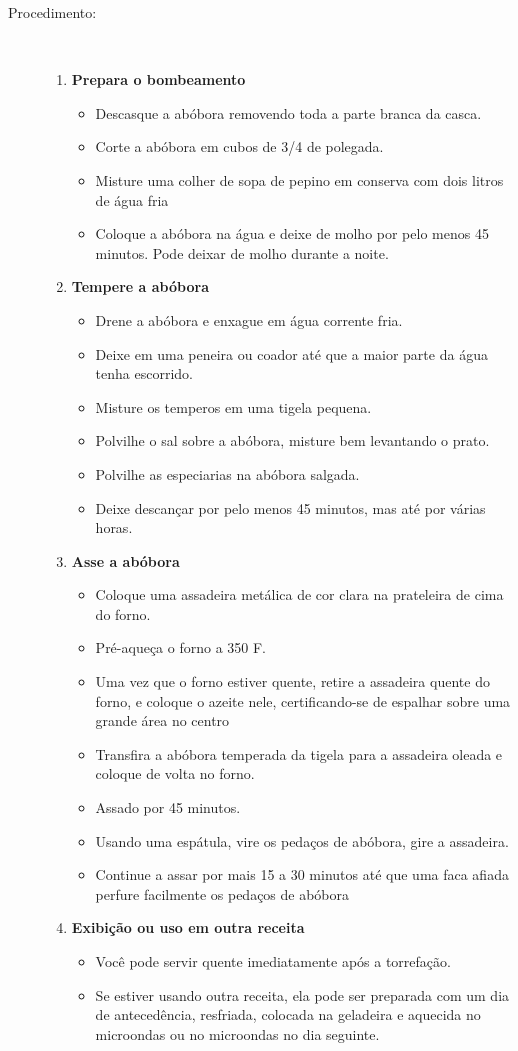 \documentclass [11pt, papel de carta] {article}
\newcommand \fileName {MoroccanRoastedButternutSquash}
\begin{document}
\begin {description}
\item [Procedimento:] \ \\
\begin {enumerate}
\item {\bf Prepara o bombeamento}
\begin {itemize}
\item Descasque a abóbora removendo toda a parte branca da casca.
\item Corte a abóbora em cubos de 3/4 de polegada.
\item Misture uma colher de sopa de pepino em conserva com dois litros de água fria
\item Coloque a abóbora na água e deixe de molho por pelo menos 45 minutos. Pode deixar de molho durante a noite.
\end {itemize}
\item {\bf Tempere a abóbora}
\begin {itemize}
\item Drene a abóbora e enxague em água corrente fria.
\item Deixe em uma peneira ou coador até que a maior parte da água tenha escorrido.
\item Misture os temperos em uma tigela pequena.
\item Polvilhe o sal sobre a abóbora, misture bem levantando o prato.
\item Polvilhe as especiarias na abóbora salgada.
\item Deixe descançar  por pelo menos 45 minutos, mas até por várias horas.
\end {itemize}
\item {\bf Asse a abóbora}
\begin {itemize}
\item Coloque uma assadeira metálica de cor clara na prateleira de cima do forno.
\item Pré-aqueça o forno a 350 F.
\item Uma vez que o forno estiver quente, retire a assadeira quente do forno, e coloque o azeite nele, certificando-se de espalhar sobre uma grande área no centro
\item Transfira a abóbora temperada da tigela para a assadeira oleada e coloque de volta no forno.
\item Assado por 45 minutos.
\item Usando uma espátula, vire os pedaços de abóbora, gire a assadeira.
\item Continue a assar por mais 15 a 30 minutos até que uma faca afiada perfure facilmente os pedaços de abóbora
\end {itemize}
\item {\bf Exibição ou uso em outra receita}
\begin {itemize}
\item Você pode servir quente imediatamente após a torrefação.
\item Se estiver usando outra receita, ela pode ser preparada com um dia de antecedência, resfriada, colocada na geladeira e aquecida no microondas ou no microondas no dia seguinte.
\end {itemize}
\end {enumerate}
\end {description}


\end{document}
